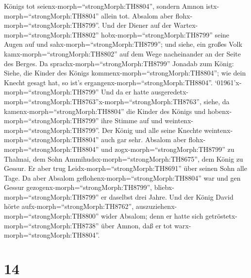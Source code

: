 Königs tot seienx-morph=``strongMorph:TH8804'', sondern Amnon
istx-morph=``strongMorph:TH8804'' allein tot.  Absalom aber
flohx-morph=``strongMorph:TH8799''. Und der Diener auf der
Wartex-morph=``strongMorph:TH8802'' hobx-morph=``strongMorph:TH8799''
seine Augen auf und sahx-morph=``strongMorph:TH8799''; und siehe, ein
großes Volk kamx-morph=``strongMorph:TH8802'' auf dem Wege nacheinander
an der Seite des Berges.  Da
sprachx-morph=``strongMorph:TH8799'' Jonadab zum König: Siehe, die
Kinder des Königs kommenx-morph=``strongMorph:TH8804''; wie dein Knecht
gesagt hat, so ist's ergangenx-morph=``strongMorph:TH8804''.
 `01961'\textbar x-morph=``strongMorph:TH8799'' Und da er
hatte
ausgeredetx-morph=``strongMorph:TH8763''x-morph=``strongMorph:TH8763'',
siehe, da kamenx-morph=``strongMorph:TH8804'' die Kinder des Königs und
hobenx-morph=``strongMorph:TH8799'' ihre Stimme auf und
weintenx-morph=``strongMorph:TH8799''. Der König und alle seine Knechte
weintenx-morph=``strongMorph:TH8804'' auch gar sehr. 
Absalom aber flohx-morph=``strongMorph:TH8804'' und
zogx-morph=``strongMorph:TH8799'' zu Thalmai, dem Sohn
Ammihudsx-morph=``strongMorph:TH8675'', dem König zu Gessur. Er aber
trug Leidx-morph=``strongMorph:TH8691'' über seinen Sohn alle Tage.
 Da aber Absalom geflohenx-morph=``strongMorph:TH8804'' war
und gen Gessur gezogenx-morph=``strongMorph:TH8799'',
bliebx-morph=``strongMorph:TH8799'' er daselbst drei Jahre.
 Und der König David hörte
aufx-morph=``strongMorph:TH8762'',
auszuziehenx-morph=``strongMorph:TH8800'' wider Absalom; denn er hatte
sich getröstetx-morph=``strongMorph:TH8738'' über Amnon, daß er tot
warx-morph=``strongMorph:TH8804''.

\hypertarget{section-13}{%
\section{14}\label{section-13}}

